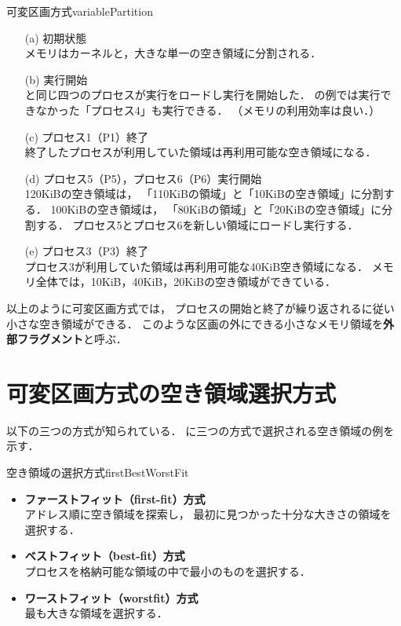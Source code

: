 {可変区画方式}{variablePartition}

\begin{enumerate}
\item[(a)] 初期状態 \\
メモリはカーネルと，大きな単一の空き領域に分割される．
\item[(b)] 実行開始 \\
と同じ四つのプロセスが実行をロードし実行を開始した．
の例では実行できなかった「プロセス4」も実行できる．
（メモリの利用効率は良い．）
\item[(c)] プロセス1（P1）終了 \\
終了したプロセスが利用していた領域は再利用可能な空き領域になる．
\item[(d)] プロセス5（P5），プロセス6（P6）実行開始 \\
120KiBの空き領域は，
「110KiBの領域」と「10KiBの空き領域」に分割する．
100KiBの空き領域は，
「80KiBの領域」と「20KiBの空き領域」に分割する．
プロセス5とプロセス6を新しい領域にロードし実行する．
\item[(e)] プロセス3（P3）終了 \\
プロセス3が利用していた領域は再利用可能な40KiB空き領域になる．
メモリ全体では，10KiB，40KiB，20KiBの空き領域ができている．
\end{enumerate}

以上のように可変区画方式では，
プロセスの開始と終了が繰り返されるに従い小さな空き領域ができる．
このような区画の外にできる小さなメモリ領域を{\bf 外部フラグメント}と呼ぶ．

\section{可変区画方式の空き領域選択方式}
以下の三つの方式が知られている．
に三つの方式で選択される空き領域の例を示す．

{空き領域の選択方式}{firstBestWorstFit}

\begin{itemize}
\item {\bf ファーストフィット（first-fit）方式}\\
アドレス順に空き領域を探索し，
最初に見つかった十分な大きさの領域を選択する．

\item {\bf ベストフィット（best-fit）方式}\\
プロセスを格納可能な領域の中で最小のものを選択する．

\item {\bf ワーストフィット（worstfit）方式}\\
最も大きな領域を選択する．
\end{itemize}

